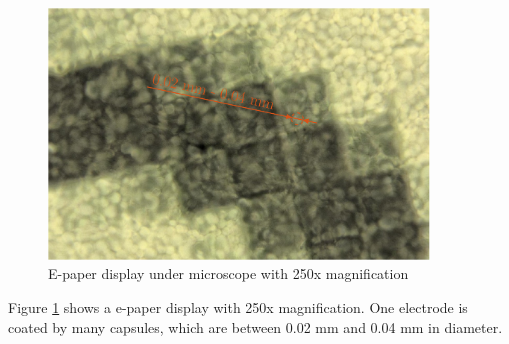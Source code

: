\begin{figure}[h]
	\centering
	\includegraphics[width=0.9\textwidth]{2-theory/e-paper-display/graphics/epaper_mikroskop.pdf}
	\caption{E-paper display under microscope with 250x magnification\label{theory:micro}}
\end{figure}

Figure \ref{theory:micro} shows a e-paper display with 250x magnification.
One electrode is coated by many capsules, which are between 0.02 mm and 0.04 mm in diameter.